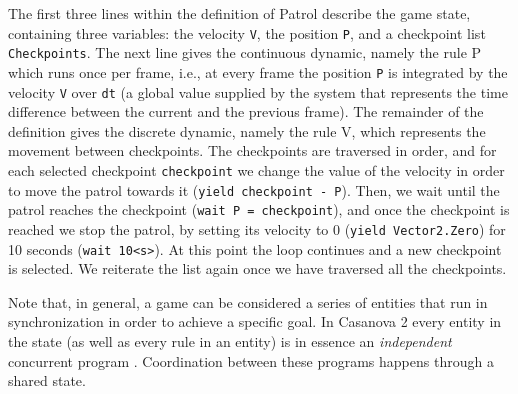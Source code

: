The first three lines within the definition of Patrol describe the game state, containing three variables: the velocity \texttt{V}, the position \texttt{P}, and a checkpoint list \texttt{Checkpoints}. The next line gives the continuous dynamic, namely the rule P which runs once per frame, i.e., at every frame the position \texttt{P} is integrated by the velocity \texttt{V} over \texttt{dt} (a global value supplied by the system that represents the time difference between the current and the previous frame). The remainder of the definition gives the discrete dynamic, namely the rule V, which represents the movement between checkpoints. The checkpoints are traversed in order, and for each selected checkpoint \texttt{checkpoint} we change the value of the velocity in order to move the patrol towards it (\texttt{yield checkpoint - P}). Then, we wait until the patrol reaches the checkpoint (\texttt{wait P = checkpoint}), and once the checkpoint is reached we stop the patrol, by setting its velocity to 0 (\texttt{yield Vector2.Zero}) for 10 seconds (\texttt{wait 10<s>}). At this point the loop continues and a new checkpoint is selected. We reiterate the list again once we have traversed all the checkpoints.

Note that, in general, a game can be considered a series of entities that run in synchronization in order to achieve a specific goal. In Casanova 2 every entity in the state (as well as every rule in an entity) is in essence an \textit{independent} concurrent program \cite{schneider1997concurrent}. Coordination between these programs happens through a shared state.




